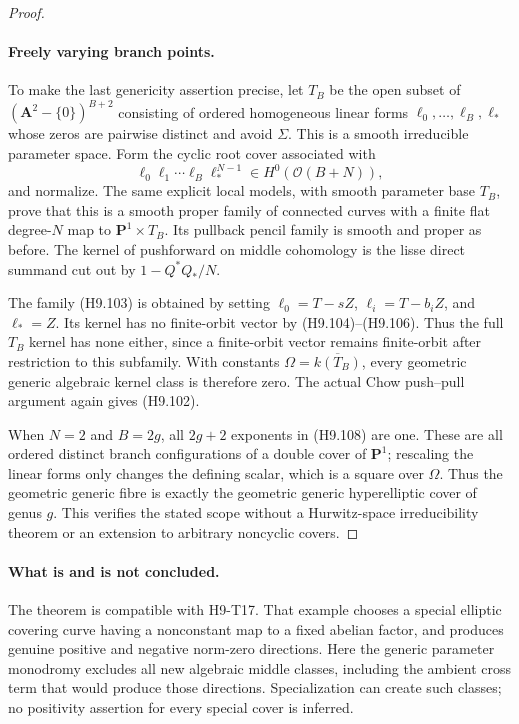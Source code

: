 \begin{proof}
\paragraph{Freely varying branch points.}
To make the last genericity assertion precise, let $T_B$ be
the open subset of $(\mathbf A^2-\{0\})^{B+2}$ consisting
of ordered homogeneous linear forms
$\ell_0,\ldots,\ell_B,\ell_*$ whose zeros are pairwise
distinct and avoid $\Sigma$. This is a smooth irreducible
parameter space. Form the cyclic root cover associated with
\[
                \ell_0\ell_1\cdots\ell_B\ell_*^{N-1}
                    \in H^0(\mathcal O(B+N)),
                                                               \tag{H9.108}
\]
and normalize. The same explicit local models, with smooth
parameter base $T_B$, prove that this is a smooth proper
family of connected curves with a finite flat degree-$N$
map to $\mathbf P^1\times T_B$. Its pullback pencil family
is smooth and proper as before. The kernel of pushforward
on middle cohomology is the lisse direct summand cut out
by $1-Q^*Q_*/N$.

The family (H9.103) is obtained by setting
$\ell_0=T-sZ$, $\ell_i=T-b_iZ$, and $\ell_*=Z$.
Its kernel has no finite-orbit vector by (H9.104)--(H9.106).
Thus the full $T_B$ kernel has none either, since a
finite-orbit vector remains finite-orbit after restriction
to this subfamily. With constants
$\Omega=\overline{k(T_B)}$, every geometric generic
algebraic kernel class is therefore zero. The actual Chow
push--pull argument again gives (H9.102).

When $N=2$ and $B=2g$, all $2g+2$ exponents in (H9.108)
are one. These are all ordered distinct branch configurations
of a double cover of $\mathbf P^1$; rescaling the linear
forms only changes the defining scalar, which is a square
over $\Omega$. Thus the geometric generic fibre is exactly
the geometric generic hyperelliptic cover of genus $g$.
This verifies the stated scope without a Hurwitz-space
irreducibility theorem or an extension to arbitrary
noncyclic covers.
\end{proof}

\paragraph{What is and is not concluded.}
The theorem is compatible with H9-T17. That example chooses
a special elliptic covering curve having a nonconstant map
to a fixed abelian factor, and produces genuine positive
and negative norm-zero directions. Here the generic
parameter monodromy excludes all new algebraic middle
classes, including the ambient cross term that would
produce those directions. Specialization can create such
classes; no positivity assertion for every special cover
is inferred.

